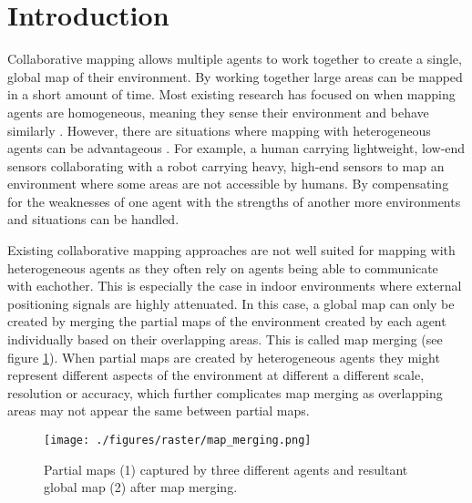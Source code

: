 
\section{Introduction}
Collaborative mapping allows multiple agents to work together to create a single, global map of their environment. By working together large areas can be mapped in a short amount of time. Most existing research has focused on when mapping agents are homogeneous, meaning they sense their environment and behave similarly \citep{andersone_heterogeneous_2019}. However, there are situations where mapping with heterogeneous agents can be advantageous \citep{hermann_design_2016}. For example, a human carrying lightweight, low-end sensors collaborating with a robot carrying heavy, high-end sensors to map an environment where some areas are not accessible by humans. By compensating for the weaknesses of one agent with the strengths of another more environments and situations can be handled. 

Existing collaborative mapping approaches are not well suited for mapping with heterogeneous agents as they often rely on agents being able to communicate with eachother. This is especially the case in indoor environments where external positioning signals are highly attenuated. In this case, a global map can only be created by merging the partial maps of the environment created by each agent individually based on their overlapping areas. This is called map merging (see figure \ref{fig:map_merging}). When partial maps are created by heterogeneous agents they might represent different aspects of the environment at different a different scale, resolution or accuracy, which further complicates map merging as overlapping areas may not appear the same between partial maps.

\begin{figure}[h]
    \centering
    \texttt{[image: ./figures/raster/map\_merging.png]}
    \caption{Partial maps (1) captured by three different agents and resultant global map (2) after map merging.}
    \label{fig:map_merging}
\end{figure}

